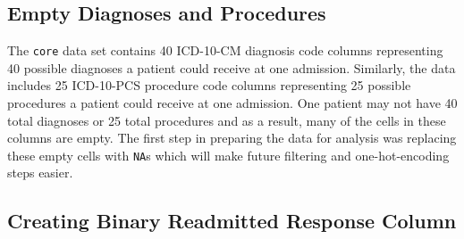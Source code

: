 \documentclass[sn-basic,pdflatex]{sn-jnl}
\theoremstyle{remark}
\theoremstyle{definition}
\begin{document}
\hypertarget{empty-diagnoses-and-procedures}{%
\subsection{Empty Diagnoses and
Procedures}\label{empty-diagnoses-and-procedures}}

The \texttt{core} data set contains 40 ICD-10-CM diagnosis code columns
representing 40 possible diagnoses a patient could receive at one
admission. Similarly, the data includes 25 ICD-10-PCS procedure code
columns representing 25 possible procedures a patient could receive at
one admission. One patient may not have 40 total diagnoses or 25 total
procedures and as a result, many of the cells in these columns are
empty. The first step in preparing the data for analysis was replacing
these empty cells with \texttt{NA}s which will make future filtering and
one-hot-encoding steps easier.

\hypertarget{creating-binary-readmitted-response-column}{%
\subsection{Creating Binary Readmitted Response
Column}\label{creating-binary-readmitted-response-column}}
\end{document}
